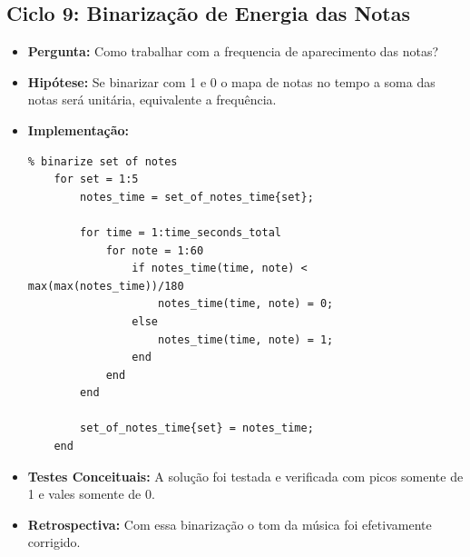 \subsection{Ciclo 9: Binarização de Energia das Notas}
\label{subsec:ciclo_9}
\begin{itemize}
\item \textbf{Pergunta:} Como trabalhar com a frequencia de aparecimento das notas?
\item \textbf{Hipótese:} Se binarizar com 1 e 0 o mapa de notas no tempo a soma das notas será unitária, equivalente a frequência.
\item \textbf{Implementação:} 
\begin{lstlisting}
% binarize set of notes
    for set = 1:5
        notes_time = set_of_notes_time{set};
        
        for time = 1:time_seconds_total
            for note = 1:60
                if notes_time(time, note) < max(max(notes_time))/180
                    notes_time(time, note) = 0;
                else
                    notes_time(time, note) = 1;
                end
            end
        end

        set_of_notes_time{set} = notes_time;
    end
\end{lstlisting}
\item \textbf{Testes Conceituais:} A solução foi testada e verificada com picos somente de 1 e vales somente de 0. 
\item \textbf{Retrospectiva:} Com essa binarização o tom da música foi efetivamente corrigido.
\end{itemize}

